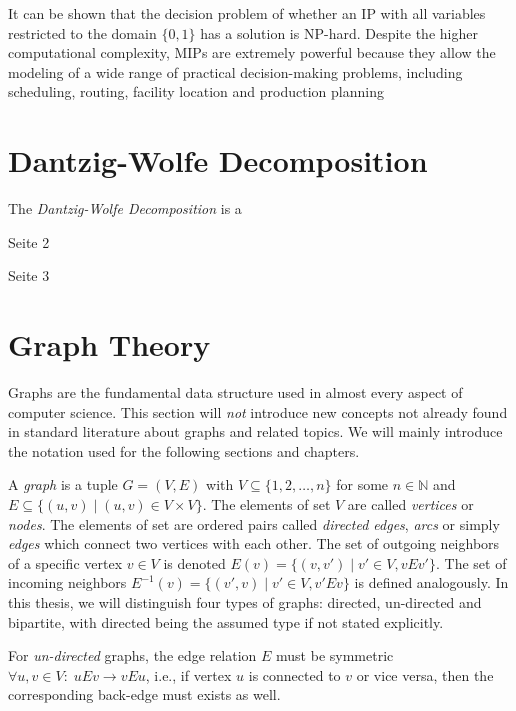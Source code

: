 			It can be shown that the decision problem of whether an \acl{IP} with all variables restricted to the domain $\{ 0, 1 \}$ has a solution is NP-hard.
			Despite the higher computational complexity, MIPs are extremely powerful because they allow the modeling of a wide range of practical decision-making problems, including scheduling, routing, facility location and production planning
	
			\clearpage		
	
	\section{Dantzig-Wolfe Decomposition}
	
		The \textit{Dantzig-Wolfe Decomposition} is a 
		
		\clearpage
		
		Seite 2
		
		\clearpage
		
		Seite 3
	
		\clearpage
	
	\section{Graph Theory}
	
		Graphs are the fundamental data structure used in almost every aspect of computer science.
		This section will \textit{not} introduce new concepts not already found in standard literature about graphs and related topics.
		We will mainly introduce the notation used for the following sections and chapters.
	
		A \textit{graph} is a tuple $G = (V, E)$ with $V \subseteq \{ 1, 2, \ldots, n \}$ for some $n \in \mathbb{N}$ and $E \subseteq \{ (u, v) \mid (u, v) \in V \times V \}$. The elements of set $V$ are called \textit{vertices} or \textit{nodes}.
		The elements of set are ordered pairs called \textit{directed edges}, \textit{arcs} or simply \textit{edges} which connect two vertices with each other.
		The set of outgoing neighbors of a specific vertex $v \in V$ is denoted $E(v) = \{ (v, v') \; | \; v' \in V, vEv' \}$. 
		The set of incoming neighbors $E^{-1}(v) = \{ (v', v) \; | \; v' \in V, v'Ev \}$ is defined analogously.
		In this thesis, we will distinguish four types of graphs: directed, un-directed and bipartite, with directed being the assumed type if not stated explicitly.
		
		For \textit{un-directed} graphs, the edge relation $E$ must be symmetric $\forall u,v \in V: \; uEv \xrightarrow{} vEu$, i.e., if vertex $u$ is connected to $v$ or vice versa, then the corresponding back-edge must exists as well.
		
